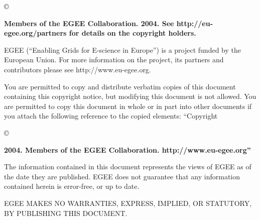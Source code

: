 %
%
\vspace*{\fill}{\bf Copyright }\copyright{\bf Members of the EGEE Collaboration.
2004. See http://eu-egee.org/partners for details on the copyright holders. 

EGEE (``Enabling Grids for E-science in Europe'') is a project funded by
the European Union.  For more information on the project, its partners
and contributors please see http://www.eu-egee.org.

You are permitted to copy and distribute verbatim copies of this
document containing this copyright notice, but modifying this document
is not allowed. You are permitted to copy this document in whole or in
part into other documents if you attach the following reference to the
copied elements: ``Copyright }\copyright{\bf 2004. Members of the EGEE
Collaboration. http://www.eu-egee.org''

The information contained in this document represents the views of
EGEE as of the date they are published. EGEE does not guarantee that
any information contained herein is error-free, or up to date.

EGEE MAKES NO WARRANTIES, EXPRESS, IMPLIED, OR STATUTORY, BY
PUBLISHING THIS DOCUMENT.}

